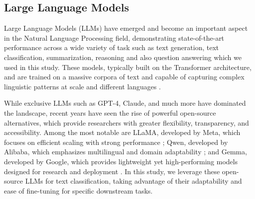 \documentclass[times]{iapress}
\begin{document}
\subsection{Large Language Models}
Large Language Models (LLMs) have emerged and become an important aspect in the Natural Language Processing field, demonstrating state-of-the-art performance across a wide variety of task such as text generation, text classification, summarization, reasoning and also question answering which we used in this study. These models, typically built on the Transformer architecture, and are trained on a massive corpora of text and capable of capturing complex linguistic patterns at scale and different languages \cite{gpt-3} \cite{gpt} \cite{deepseek}.

While exclusive LLMs such as GPT-4, Claude, and much more \cite{deepseek} \cite{claude} \cite{gpt} have dominated the landscape, recent years have seen the rise of powerful open-source alternatives, which provide researchers with greater flexibility, transparency, and accessibility. Among the most notable are LLaMA, developed by Meta, which focuses on efficient scaling with strong performance \cite{llama}; Qwen, developed by Alibaba, which emphasizes multilingual and domain adaptability \cite{qwen}; and Gemma, developed by Google, which provides lightweight yet high-performing models designed for research and deployment \cite{gemma}. In this study, we leverage these open-source LLMs for text classification, taking advantage of their adaptability and ease of fine-tuning for specific downstream tasks.
\end{document}
